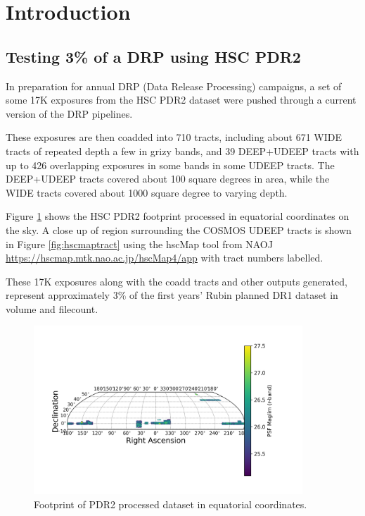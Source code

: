 \section{Introduction}\label{sec:intro}

\subsection{Testing 3\% of a DRP using HSC PDR2}

In preparation for annual DRP (Data Release Processing) campaigns, 
a set of some 17K exposures from the HSC PDR2 dataset were pushed through
a current version of the DRP pipelines.

These exposures are then coadded into 710 tracts, including about 671
WIDE tracts of repeated depth a few in grizy bands, and 39 DEEP+UDEEP 
tracts with up to 426 overlapping exposures in some bands in some UDEEP tracts.
The DEEP+UDEEP tracts covered about 100 square degrees in area, while the
WIDE tracts covered about 1000 square degree to varying depth.

Figure \ref{fig:footprint1} shows the HSC PDR2 footprint processed in equatorial coordinates
on the sky.    A close up of region surrounding the COSMOS UDEEP tracts is shown in Figure \ref{fig:hscmaptract} using the hscMap tool from NAOJ \url{https://hscmap.mtk.nao.ac.jp/hscMap4/app} with tract numbers labelled.

These 17K exposures along with the coadd tracts and other
outputs generated, represent approximately 3\% of the first 
years' Rubin planned DR1 dataset in volume and filecount.

\begin{figure}[h]
\includegraphics[width=0.9\textwidth]{r_maglim_pdr2.png}
	 \caption{Footprint of PDR2 processed dataset in equatorial coordinates.  \label{fig:footprint1}}
\end{figure}

